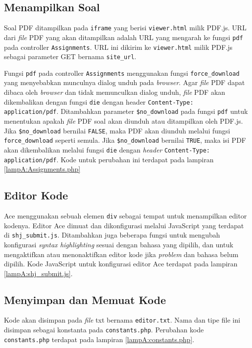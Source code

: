 \subsection{Menampilkan Soal}
\label{subsec:5:soal}

Soal PDF ditampilkan pada \verb|iframe| yang berisi \verb|viewer.html| milik PDF.js. URL dari \textit{file} PDF yang akan ditampilkan adalah URL yang mengarah ke fungsi \verb|pdf| pada controller \verb|Assignments|. URL ini dikirim ke \verb|viewer.html| milik PDF.js sebagai parameter GET bernama \verb|site_url|.

Fungsi \verb|pdf| pada controller \verb|Assignments| menggunakan fungsi \verb|force_download| yang menyebabkan munculnya dialog unduh pada \textit{browser}. Agar \textit{file} PDF dapat dibaca oleh \textit{browser} dan tidak memunculkan dialog unduh, \textit{file} PDF akan dikembalikan dengan fungsi \verb|die| dengan header \verb|Content-Type: application/pdf|. Ditambahkan parameter \verb|$no_download| pada fungsi \verb|pdf| untuk menentukan apakah \textit{file} PDF soal akan diunduh atau ditampilkan oleh PDF.js. Jika \verb|$no_download| bernilai \verb|FALSE|, maka PDF akan diunduh melalui fungsi \verb|force_download| seperti semula. Jika \verb|$no_download| bernilai \verb|TRUE|, maka isi PDF akan dikembalikan melalui fungsi \verb|die| dengan \textit{header} \verb|Content-Type: application/pdf|. Kode untuk perubahan ini terdapat pada lampiran \ref{lampA:Assignments.php}

\subsection{Editor Kode}
\label{subsec:5:editor}

Ace menggunakan sebuah elemen \verb|div| sebagai tempat untuk menampilkan editor kodenya. Editor Ace dimuat dan dikonfigurasi melalui JavaScript yang terdapat di \verb|shj_submit.js|. Ditambahkan juga beberapa fungsi untuk mengubah konfigurasi \textit{syntax highlighting} sesuai dengan bahasa yang dipilih, dan untuk mengaktifkan atau menonaktifkan editor kode jika \textit{problem} dan bahasa belum dipilih. Kode JavaScript untuk konfigurasi editor Ace terdapat pada lampiran \ref{lampA:shj_submit.js}.

\subsection{Menyimpan dan Memuat Kode}
\label{subsec:5:simpan}

Kode akan disimpan pada \textit{file} txt bernama \verb|editor.txt|. Nama dan tipe file ini disimpan sebagai konstanta pada \verb|constants.php|. Perubahan kode \verb|constants.php| terdapat pada lampiran \ref{lampA:constants.php}.

